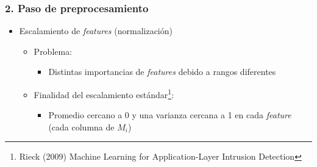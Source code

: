 \begin{frame}
    \frametitle{2. Paso de preprocesamiento}

    \begin{itemize}
        \item
        Escalamiento de \textit{features} (normalización)

        \begin{itemize}
            \item
            Problema:

            \begin{itemize}
                \item
                Distintas importancias de \textit{features} debido a
                rangos diferentes
            \end{itemize}

            \item<2->
            Finalidad del escalamiento estándar\footnote{Rieck (2009) Machine
                Learning for Application-Layer Intrusion Detection}:

            \begin{itemize}[<2->]
                \item
                Promedio cercano a 0 y una varianza cercana a 1 en cada
                \textit{feature} (cada columna de $M_{i}$)
            \end{itemize}
        \end{itemize}
    \end{itemize}

\end{frame}

